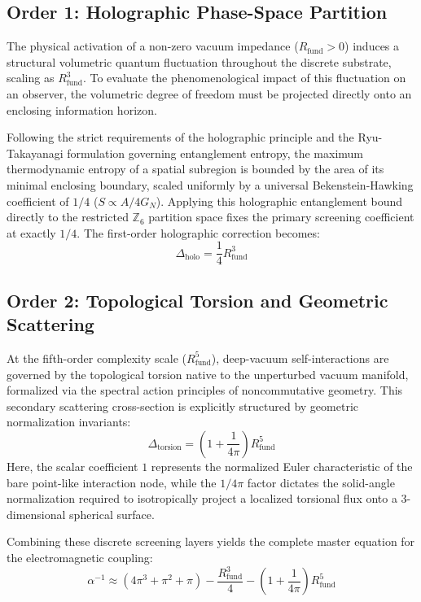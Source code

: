 \documentclass[12pt,a4paper]{article}
\begin{document}
\subsection{Order 1: Holographic Phase-Space Partition}

The physical activation of a non-zero vacuum impedance ($R_{\text{fund}} > 0$) induces a structural volumetric quantum fluctuation throughout the discrete substrate, scaling as $R_{\text{fund}}^3$. To evaluate the phenomenological impact of this fluctuation on an observer, the volumetric degree of freedom must be projected directly onto an enclosing information horizon.

Following the strict requirements of the holographic principle and the Ryu-Takayanagi formulation governing entanglement entropy, the maximum thermodynamic entropy of a spatial subregion is bounded by the area of its minimal enclosing boundary, scaled uniformly by a universal Bekenstein-Hawking coefficient of $1/4$ ($S \propto A/4G_N$). Applying this holographic entanglement bound directly to the restricted $\mathbb{Z}_6$ partition space fixes the primary screening coefficient at exactly $1/4$. The first-order holographic correction becomes:
\begin{equation}
\Delta_{\text{holo}} = \frac{1}{4} R_{\text{fund}}^3
\end{equation}

\subsection{Order 2: Topological Torsion and Geometric Scattering}

At the fifth-order complexity scale ($R_{\text{fund}}^5$), deep-vacuum self-interactions are governed by the topological torsion native to the unperturbed vacuum manifold, formalized via the spectral action principles of noncommutative geometry. This secondary scattering cross-section is explicitly structured by geometric normalization invariants:
\begin{equation}
\Delta_{\text{torsion}} = \left(1 + \frac{1}{4\pi}\right) R_{\text{fund}}^5
\end{equation}
Here, the scalar coefficient $1$ represents the normalized Euler characteristic of the bare point-like interaction node, while the $1/4\pi$ factor dictates the solid-angle normalization required to isotropically project a localized torsional flux onto a 3-dimensional spherical surface.

Combining these discrete screening layers yields the complete master equation for the electromagnetic coupling:
\begin{equation}
\boxed{
\alpha^{-1} \approx (4\pi^3 + \pi^2 + \pi) - \frac{R_{\text{fund}}^3}{4} - \left(1 + \frac{1}{4\pi}\right)R_{\text{fund}}^5
}
\label{eq:master}
\end{equation}
\end{document}

